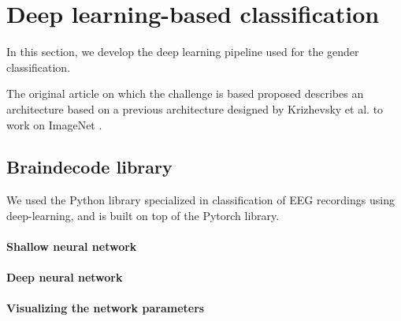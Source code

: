 \section{Deep learning-based classification}

In this section, we develop the deep learning pipeline used for the gender classification. 

The original article on which the challenge is based proposed \cite{vanPutten2018} describes an architecture based on a previous architecture designed by Krizhevsky et al. to work on ImageNet \cite{Krizhevsky2012}. 


\subsection{Braindecode library}

We used the Python library \cite{braindecode} specialized in classification of EEG recordings using deep-learning, and is built on top of the Pytorch library. %

\paragraph{Shallow neural network}


\paragraph{Deep neural network}

\paragraph{Visualizing the network parameters}
